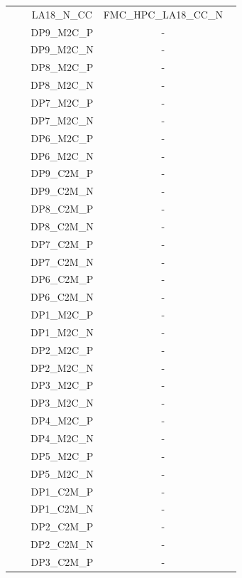 \documentclass{article}
\begin{document}
\begin{longtable}[l]{|c|c|c|c|}
	\\\cline{3-4}
	& & LA18\_N\_CC & FMC\_HPC\_LA18\_CC\_N \
	\\\cline{3-4}
  & & DP9\_M2C\_P & - \
  \\\cline{3-4}
  & & DP9\_M2C\_N & - \
  \\\cline{3-4}
  & & DP8\_M2C\_P & - \
  \\\cline{3-4}
  & & DP8\_M2C\_N & - \
  \\\cline{3-4}
  & & DP7\_M2C\_P & - \
  \\\cline{3-4}
  & & DP7\_M2C\_N & - \
  \\\cline{3-4}
  & & DP6\_M2C\_P & - \
  \\\cline{3-4}
  & & DP6\_M2C\_N & - \
  \\\cline{3-4}
  & & DP9\_C2M\_P & - \
  \\\cline{3-4}
  & & DP9\_C2M\_N & - \
  \\\cline{3-4}
  & & DP8\_C2M\_P & - \
  \\\cline{3-4}
  & & DP8\_C2M\_N & - \
  \\\cline{3-4}
  & & DP7\_C2M\_P & - \
  \\\cline{3-4}
  & & DP7\_C2M\_N & - \
  \\\cline{3-4}
  & & DP6\_C2M\_P & - \
  \\\cline{3-4}
  & & DP6\_C2M\_N & - \
  \\\cline{3-4}
  & & DP1\_M2C\_P & - \
  \\\cline{3-4}
  & & DP1\_M2C\_N & - \
  \\\cline{3-4}
  & & DP2\_M2C\_P & - \
  \\\cline{3-4}
  & & DP2\_M2C\_N & - \
  \\\cline{3-4}
  & & DP3\_M2C\_P & - \
  \\\cline{3-4}
  & & DP3\_M2C\_N & - \
  \\\cline{3-4}
  & & DP4\_M2C\_P & - \
  \\\cline{3-4}
  & & DP4\_M2C\_N & - \
  \\\cline{3-4}
  & & DP5\_M2C\_P & - \
  \\\cline{3-4}
  & & DP5\_M2C\_N & - \
  \\\cline{3-4}
  & & DP1\_C2M\_P & - \
  \\\cline{3-4}
  & & DP1\_C2M\_N & - \
  \\\cline{3-4}
  & & DP2\_C2M\_P & - \
  \\\cline{3-4}
  & & DP2\_C2M\_N & - \
  \\\cline{3-4}
  & & DP3\_C2M\_P & - \
  \\\cline{3-4}

\end{longtable}
\end{document}
